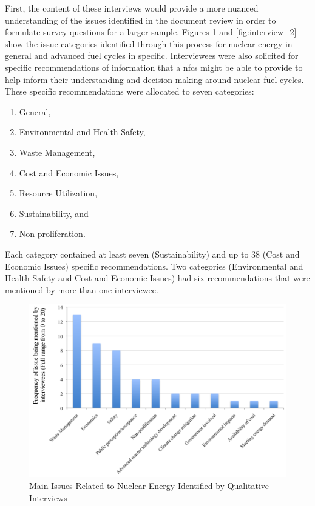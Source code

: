 First, the content of these interviews would provide a more nuanced
understanding of the issues identified in the document review in order to
formulate survey questions for a larger sample.  Figures \ref{fig:interview_1}
and \ref{fig:interview_2} show the issue categories identified through this
process for nuclear energy in general and advanced fuel cycles in specific.
Interviewees were also solicited for specific recommendations of information
that a \gls{nfcs} might be able to provide to help inform their understanding
and decision making around nuclear fuel cycles.  These specific
recommendations were allocated to seven categories:
\begin{enumerate}
\item General,
\item Environmental and Health Safety,
\item Waste Management,
\item Cost and Economic Issues,
\item Resource Utilization,
\item Sustainability, and
\item Non-proliferation.
\end{enumerate}

Each category contained at least seven (Sustainability) and up to 38 (Cost and
Economic Issues) specific recommendations.  Two categories (Environmental and
Health Safety and Cost and Economic Issues) had six recommendations that were
mentioned by more than one interviewee.

\begin{figure}[htbp]
  \centering
  \includegraphics[width=0.7\columnwidth]{./images/interview_1}
  \caption{Main Issues Related to Nuclear Energy Identified by Qualitative Interviews}
  \label{fig:interview_1}
\end{figure}


